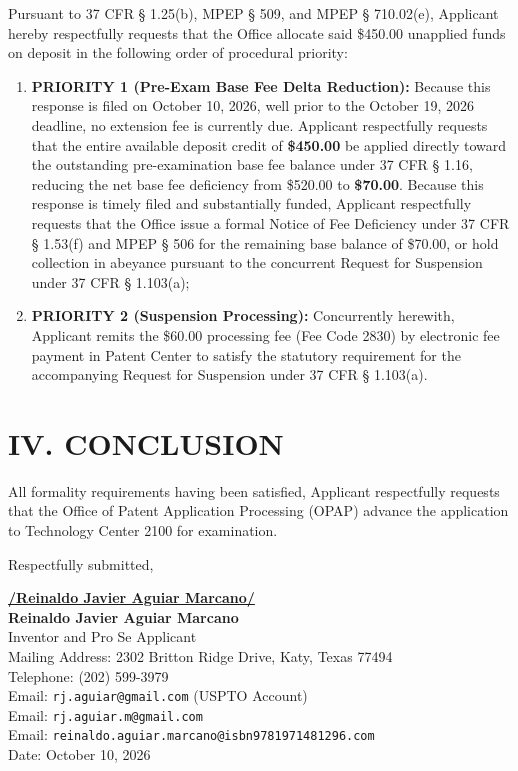 \documentclass[11pt,letterpaper]{article}
\begin{document}
Pursuant to 37 CFR \S{} 1.25(b), MPEP \S{} 509, and MPEP \S{} 710.02(e), Applicant hereby respectfully requests that the Office allocate said \$450.00 unapplied funds on deposit in the following order of procedural priority:
\begin{enumerate}[leftmargin=*]
    \item \textbf{PRIORITY 1 (Pre-Exam Base Fee Delta Reduction):} Because this response is filed on October 10, 2026, well prior to the October 19, 2026 deadline, no extension fee is currently due. Applicant respectfully requests that the entire available deposit credit of \textbf{\$450.00} be applied directly toward the outstanding pre-examination base fee balance under 37 CFR \S{} 1.16, reducing the net base fee deficiency from \$520.00 to \textbf{\$70.00}. Because this response is timely filed and substantially funded, Applicant respectfully requests that the Office issue a formal Notice of Fee Deficiency under 37 CFR \S{} 1.53(f) and MPEP \S{} 506 for the remaining base balance of \$70.00, or hold collection in abeyance pursuant to the concurrent Request for Suspension under 37 CFR \S{} 1.103(a);
    \item \textbf{PRIORITY 2 (Suspension Processing):} Concurrently herewith, Applicant remits the \$60.00 processing fee (Fee Code 2830) by electronic fee payment in Patent Center to satisfy the statutory requirement for the accompanying Request for Suspension under 37 CFR \S{} 1.103(a).
\end{enumerate}

\section*{IV. CONCLUSION}

All formality requirements having been satisfied, Applicant respectfully requests that the Office of Patent Application Processing (OPAP) advance the application to Technology Center 2100 for examination.

\vspace{0.6cm}
\begin{singlespace}
\noindent Respectfully submitted, \par\vspace{0.8cm}
\underline{\textbf{/Reinaldo Javier Aguiar Marcano/}} \\
\textbf{Reinaldo Javier Aguiar Marcano} \\
Inventor and Pro Se Applicant \\
Mailing Address: 2302 Britton Ridge Drive, Katy, Texas 77494 \\
Telephone: (202) 599-3979 \\
Email: \texttt{rj.aguiar@gmail.com} (USPTO Account) \\
Email: \texttt{rj.aguiar.m@gmail.com} \\
Email: \texttt{reinaldo.aguiar.marcano@isbn9781971481296.com} \\
Date: October 10, 2026
\end{singlespace}
\end{document}
